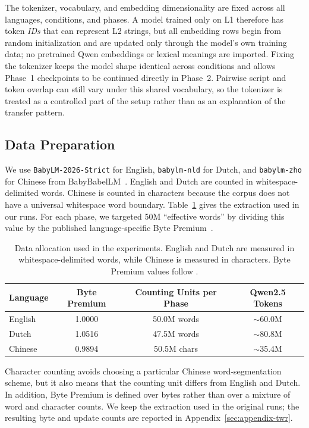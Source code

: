 \documentclass[11pt]{article}
\begin{document}
The tokenizer, vocabulary, and embedding dimensionality are fixed across all languages, conditions, and phases. A model trained only on L1 therefore has token \emph{IDs} that can represent L2 strings, but all embedding rows begin from random initialization and are updated only through the model's own training data; no pretrained Qwen embeddings or lexical meanings are imported. Fixing the tokenizer keeps the model shape identical across conditions and allows Phase~1 checkpoints to be continued directly in Phase~2. Pairwise script and token overlap can still vary under this shared vocabulary, so the tokenizer is treated as a controlled part of the setup rather than as an explanation of the transfer pattern.

\subsection{Data Preparation}
We use \texttt{BabyLM-2026-Strict} for English, \texttt{babylm-nld} for Dutch, and \texttt{babylm-zho} for Chinese from BabyBabelLM~\citep{jumelet-etal-2026-babybabellm}. English and Dutch are counted in whitespace-delimited words. Chinese is counted in characters because the corpus does not have a universal whitespace word boundary. Table~\ref{tab:data-prep} gives the extraction used in our runs. For each phase, we targeted 50M ``effective words'' by dividing this value by the published language-specific Byte Premium~\citep{arnett-etal-2024-bit}.

\begin{table}[tb]
\centering
\small
\begin{tabular}{lccc}
\hline
\textbf{Language} & \textbf{Byte Premium} & \textbf{Counting Units per Phase} & \textbf{Qwen2.5 Tokens} \\ \hline
English  & 1.0000 & 50.0M words   & $\sim$60.0M \\
Dutch    & 1.0516 & 47.5M words   & $\sim$80.8M \\
Chinese  & 0.9894 & 50.5M chars   & $\sim$35.4M \\ \hline
\end{tabular}
\caption{Data allocation used in the experiments. English and Dutch are measured in whitespace-delimited words, while Chinese is measured in characters. Byte Premium values follow \citet{arnett-etal-2024-bit}.}
\label{tab:data-prep}
\end{table}

Character counting avoids choosing a particular Chinese word-segmentation scheme, but it also means that the counting unit differs from English and Dutch. In addition, Byte Premium is defined over bytes rather than over a mixture of word and character counts. We keep the extraction used in the original runs; the resulting byte and update counts are reported in Appendix~\ref{sec:appendix-twr}.
\end{document}

